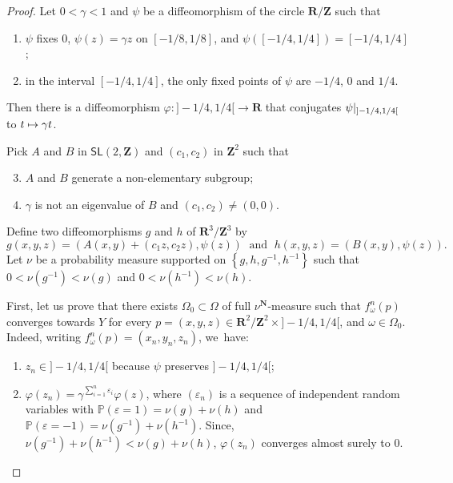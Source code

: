 \documentclass[11pt]{article}
\newenvironment{enumeratei}
{\bgroup\def\theenumi{\roman{enumi}}\def\theenumii{\arabic{enumii}}\begin{enumerate}}
{\end{enumerate}\egroup}
\newcommand\mto{\mathchoice{\longmapsto}{\mapsto}{\mapsto}{\mapsto}}
\let\e\varepsilon
\newcommand{\set}[1]{\left\{#1\right\}}
\newcommand{\rest}[1]{ \arrowvert_{#1}}
\newcommand{\inv}{^{-1}}
\newcommand{\pp}{\mathbb{P}}\let\P\pp
\def\R{\mathbf{R}}
\def\Z{\mathbf{Z}}
\def\N{\mathbf{N}}
\newcommand\SL{{\mathsf{SL}}}
\theoremstyle{plain}
\theoremstyle{definition}
\numberwithin{equation}{section}
\begin{document}
\begin{proof}

Let $0<\gamma<1$ and $\psi$ be a diffeomorphism of the circle $\R/\Z$ such that
\begin{enumeratei}
\item\label{hyp:i} $\psi$ fixes $0$, $\psi(z)=\gamma z$ on $[-1/8,1/8]$, and $\psi([-1/4,1/4]) = [-1/4,1/4]$;
\item\label{hyp:ii} in the interval $[-1/4, 1/4]$, the only fixed points of $\psi$ are $-1/4$, $0$ and $1/4$.
\end{enumeratei}
Then there is a diffeomorphism $\varphi\colon ]-1/4,1/4[\to \R$ that conjugates $\psi\rest{ ]-1/4,1/4[}$ to $t\mto \gamma t$.

Pick $A$ and $ B$ in $ \SL(2, \Z)$ and $(c_1,c_2)$ in $\Z^2$ such that
\begin{enumeratei}\setcounter{enumi}{2}
\item\label{hyp:iii}
$A$ and $B$ generate a non-elementary subgroup;
\item\label{hyp:iv}
$\gamma$ is not an eigenvalue of $B$
and $(c_1,c_2)\neq (0,0)$.
\end{enumeratei}
Define two diffeomorphisms $g$ and $h$ of $\R^3/\Z^3$ by
\begin{equation*}
g(x,y,z) = (A(x,y)+(c_1z, c_2z), \psi(z))\; \text{ and } \; h(x,y,z) = (B(x,y), \psi(z)).
\end{equation*}
Let $\nu$ be a probability measure supported on $\set{g, h, g\inv, h\inv}$ such that
$0<\nu(g\inv)<\nu(g)$ and $0<\nu(h\inv)<\nu(h)$.

First, let us prove that there exists $\Omega_0\subset \Omega$ of full
$\nu^\N$-measure such that $f_\omega^n(p)$ converges towards $Y$ for every $p = (x,y,z)\in \R^2/\Z^2 \times{}]-1/4, 1/4[$,
and $\omega\in \Omega_0$. Indeed, writing $f_\omega^n(p) = (x_n, y_n, z_n)$, we~have:
\begin{enumerate}
\item $z_n\in{} ]-1/4, 1/4[$ because $\psi$ preserves $]-1/4, 1/4[$;
\item $\varphi(z_n ) = \gamma^{\sum_{i=1}^{n} \e_i} \varphi(z)$, where
$(\e_n)$ is a sequence of independent random variables with
$\pp(\e =1 ) = \nu(g)+\nu(h)$ and $\pp(\e =-1 ) = \nu(g\inv)+\nu(h\inv)$. Since, $\nu(g\inv)+\nu(h\inv)< \nu(g)+\nu(h)$, $\varphi(z_n)$ converges almost surely to $0$.
\end{enumerate}


\end{proof}
\end{document}
